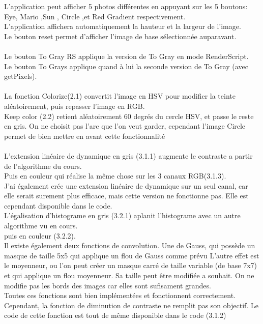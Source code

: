 \documentclass[12pt]{article}
\begin{document}
L'application peut afficher 5 photos différentes en appuyant sur les 5 boutons: Eye, Mario ,Sun , Circle ,et Red Gradient respectivement.\\
L'application affichera automatiquement la hauteur et la largeur de l'image.\\
Le bouton reset permet d'afficher l'image de base sélectionnée auparavant.\\
\\
Le bouton To Gray RS applique la version de To Gray en mode RenderScript.\\
Le bouton To Grays applique quand à lui la seconde version de To Gray (avec getPixels).\\
\\
La fonction Colorize(2.1) convertit l'image en HSV pour modifier la teinte aléatoirement, puis repasser l'image en RGB.\\
Keep color (2.2) retient aléatoirement 60 degrés du cercle HSV, et passe le reste en gris. On ne choisit pas l'arc que l'on veut garder, cependant l'image Circle permet de bien mettre en avant cette fonctionnalité\\
\\
L'extension linéaire de dynamique en gris (3.1.1) augmente le contraste a partir de l'algorithme du cours.\\
Puis en couleur qui réalise la même chose sur les 3 canaux RGB(3.1.3).\\
J'ai également crée une extension linéaire de dynamique sur un seul canal, car elle serait surement plus efficace, mais cette version ne fonctionne pas. Elle est cependant disponible dans le code.\\
L'égalisation d'histograme en gris (3.2.1) aplanit l'histograme avec un autre algorithme vu en cours.\\
puis en couleur (3.2.2).\\
Il existe également deux fonctions de convolution. Une de Gauss, qui possède un masque de taille 5x5 qui applique un flou de Gauss comme prévu
L'autre effet est le moyenneur, ou l'on peut créer un masque carré de taille variable (de base 7x7) et qui applique un flou moyenneur. Sa taille peut être modifiée a souhait.
On ne modifie pas les bords des images car elles sont sufisament grandes.
\\
Toutes ces fonctions sont bien implémentées et fonctionnent correctement.
\\
Cependant, la fonction de diminution de contraste ne remplit pas son objectif. Le code de cette fonction est tout de même disponible dans le code (3.1.2)\\
\end{document}
